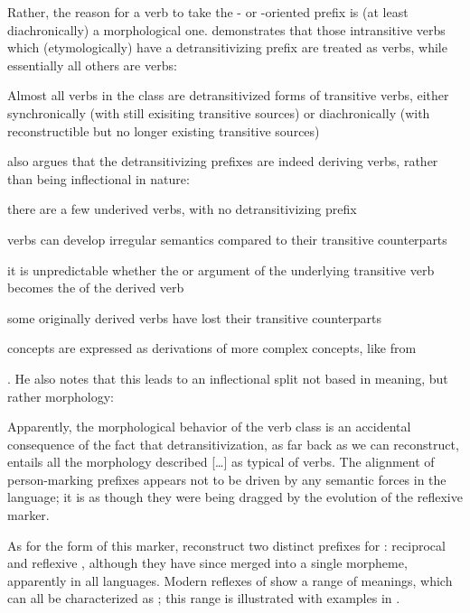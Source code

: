 Rather, the reason for a verb to take the - or -oriented prefix is (at least diachronically) a morphological one.
\textcite[217--221]{meira2000split} demonstrates that those intransitive verbs which (etymologically) have a detransitivizing prefix are treated as  verbs, while essentially all others are  verbs:
\begin{quotebox}{\parencite[201]{meira2000split}}
	Almost all verbs in the  class are detransitivized forms of transitive verbs, either synchronically (with still exisiting transitive sources) or diachronically (with reconstructible but no longer existing transitive sources)
\end{quotebox}
\textcite[221--223]{meira2000split} also argues that the detransitivizing prefixes are indeed deriving  verbs, rather than being inflectional in nature:
\begin{inlinelist}
	\item there are a few underived  verbs, with no detransitivizing prefix
	\item {} verbs can develop irregular semantics compared to their transitive counterparts
	\item it is unpredictable whether the  or  argument of the underlying transitive verb becomes the  of the derived  verb
	\item some originally derived  verbs have lost their transitive counterparts
	\item {} concepts are expressed as derivations of more complex concepts, like  from 
\end{inlinelist}.
He also notes that this leads to an inflectional split not based in meaning, but rather morphology:

\begin{quotebox}{\parencite[226]{meira2000split}}
	Apparently, the morphological behavior of the  verb class is an accidental consequence of the fact that detransitivization, as far back as we can reconstruct, entails all the morphology described […] as typical of  verbs. The alignment of person-marking prefixes appears not to be driven by any semantic forces in the language; it is as though they were being dragged by the evolution of the reflexive marker.
\end{quotebox}

As for the form of this marker, \textcite[505--512]{meira2010origin} reconstruct two distinct  prefixes for \PC: reciprocal  and reflexive , although they have since merged into a single morpheme, apparently in all languages.
Modern reflexes of \detrz show a range of meanings, which can all be characterized as ; this range is illustrated with \trio examples in .

